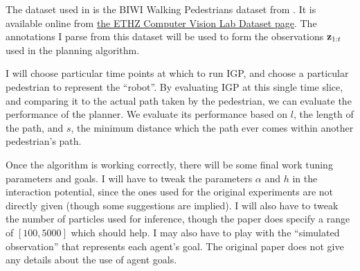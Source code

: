 \documentclass[a4paper,11pt,headings=small]{article}
\begin{document}
The dataset used in \cite{Trautman2010} is the BIWI Walking Pedestrians dataset from \cite{Pellegrini2009}. It is available online from \href{http://www.vision.ee.ethz.ch/datasets/index.en.html}{the ETHZ Computer Vision Lab Dataset page}. The annotations I parse from this dataset will be used to form the observations $\mathbf{z}_{1:t}$ used in the planning algorithm.

I will choose particular time points at which to run IGP, and choose a particular pedestrian to represent the ``robot''. By evaluating IGP at this single time slice, and comparing it to the actual path taken by the pedestrian, we can evaluate the performance of the planner. We evaluate its performance based on $l$, the length of the path, and $s$, the minimum distance which the path ever comes within another pedestrian's path.

Once the algorithm is working correctly, there will be some final work tuning parameters and goals. I will have to tweak the parameters $\alpha$ and $h$ in the interaction potential, since the ones used for the original experiments are not directly given (though some suggestions are implied). I will also have to tweak the number of particles used for inference, though the paper does specify a range of $[100,5000]$ which should help. I may also have to play with the ``simulated observation'' that represents each agent's goal. The original paper does not give any details about the use of agent goals.




\end{document}
